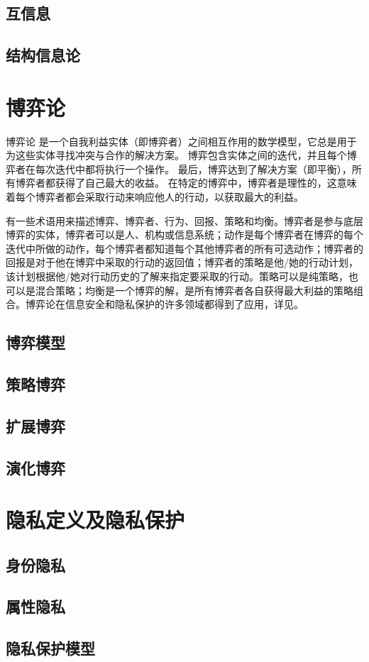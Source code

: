 \subsection{互信息}
\subsection{结构信息论}

\section{博弈论}
博弈论\cite{owen2001,gibbons1992} 是一个自我利益实体（即博弈者）之间相互作用的数学模型，它总是用于为这些实体寻找冲突与合作的解决方案。 博弈包含实体之间的迭代，并且每个博弈者在每次迭代中都将执行一个操作。 最后，博弈达到了解决方案（即平衡），所有博弈者都获得了自己最大的收益。 在特定的博弈中，博弈者是理性的，这意味着每个博弈者都会采取行动来响应他人的行动，以获取最大的利益。

有一些术语用来描述博弈、博弈者、行为、回报、策略和均衡\cite{liang2013}。博弈者是参与底层博弈的实体，博弈者可以是人、机构或信息系统；动作是每个博弈者在博弈的每个迭代中所做的动作，每个博弈者都知道每个其他博弈者的所有可选动作；博弈者的回报是对于他在博弈中采取的行动的返回值；博弈者的策略是他/她的行动计划，该计划根据他/她对行动历史的了解来指定要采取的行动。策略可以是纯策略，也可以是混合策略；均衡是一个博弈的解，是所有博弈者各自获得最大利益的策略组合。博弈论在信息安全和隐私保护的许多领域都得到了应用，详见\cite{liang2013,tian2019}。
\subsection{博弈模型}
\subsection{策略博弈}
\subsection{扩展博弈}
\subsection{演化博弈}


\section{隐私定义及隐私保护}
\subsection{身份隐私}
\subsection{属性隐私}
\subsection{隐私保护模型}

